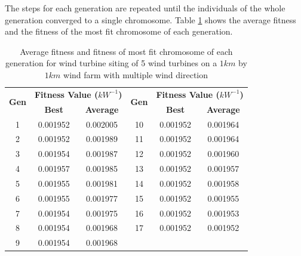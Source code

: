     The steps for each generation are repeated until the individuals of the whole generation converged to a single chromosome. Table \ref{summaryGASmall} shows the average fitness and the fitness of the most fit chromosome of each generation.
    
    \begin{table}[]
        \centering
        \begin{tabular}{|ccc|ccc|}
            \hline
            \multirow{2}{*}{\textbf{Gen}} & \multicolumn{2}{c|}{\textbf{Fitness Value ($kW^{-1}$)}} & \multirow{2}{*}{\textbf{Gen}} & \multicolumn{2}{c|}{\textbf{Fitness Value ($kW^{-1}$)}} \\ \cline{2-3} \cline{5-6} 
                                          & \textbf{Best}       & \textbf{Average}      &                               & \textbf{Best}       & \textbf{Average}      \\ \hline
            1                             & 0.001952            & 0.002005              & 10                            & 0.001952            & 0.001964              \\ \hline
            2                             & 0.001952            & 0.001989              & 11                            & 0.001952            & 0.001964              \\ \hline
            3                             & 0.001954            & 0.001987              & 12                            & 0.001952            & 0.001960              \\ \hline
            4                             & 0.001957            & 0.001985              & 13                            & 0.001952            & 0.001957              \\ \hline
            5                             & 0.001955            & 0.001981              & 14                            & 0.001952            & 0.001958              \\ \hline
            6                             & 0.001955            & 0.001977              & 15                            & 0.001952            & 0.001955              \\ \hline
            7                             & 0.001954            & 0.001975              & 16                            & 0.001952            & 0.001953              \\ \hline
            8                             & 0.001954            & 0.001968              & 17                            & 0.001952            & 0.001952              \\ \hline
            9                             & 0.001954            & 0.001968              &                               &                     &                       \\ \hline
        \end{tabular}
        \caption{Average fitness and fitness of most fit chromosome of each generation for wind turbine siting of 5 wind turbines on a $1km$ by $1km$ wind farm with multiple wind direction}
        \label{summaryGASmall}
    \end{table}
    
